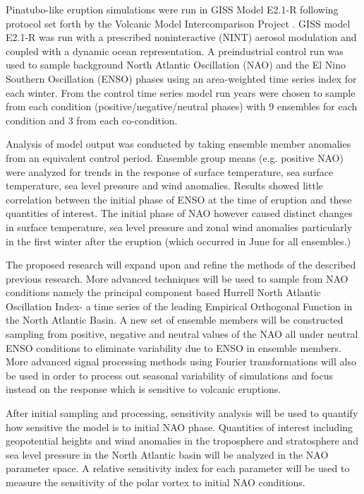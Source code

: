 \documentclass[11pt]{NSFamsart}
\begin{document}
Pinatubo-like eruption simulations were run in GISS Model E2.1-R following protocol set forth by the Volcanic Model Intercomparison Project \cite{zanchettin2016model}. GISS model E2.1-R was run with a prescribed noninteractive (NINT) aerosol modulation and coupled with a dynamic ocean representation. A preindustrial control run was used to sample background North Atlantic Oscillation (NAO) and the El Nino Southern Oscillation (ENSO) phases using an area-weighted time series index for each winter. From the control time series model run years were chosen to sample from each condition (positive/negative/neutral phases) with 9 ensembles for each condition and 3 from each co-condition. 

Analysis of model output was conducted by taking ensemble member anomalies from an equivalent control period. Ensemble group means (e.g. positive NAO) were analyzed for trends in the response of surface temperature, sea surface temperature, sea level pressure and wind anomalies. Results showed little correlation between the initial phase of ENSO at the time of eruption and these quantities of interest. The initial phase of NAO however caused distinct changes in surface temperature, sea level pressure and zonal wind anomalies particularly in the first winter after the eruption (which occurred in June for all ensembles.)

The proposed research will expand upon and refine the methods of the described previous research. More advanced techniques will be used to sample from NAO conditions namely the principal component based Hurrell North Atlantic Oscillation Index- a time series of the leading Empirical Orthogonal Function in the North Atlantic Basin. A new set of ensemble members will be constructed sampling from positive, negative and neutral values of the NAO all under neutral ENSO conditions to eliminate variability due to ENSO in ensemble members. More advanced signal processing methods using Fourier transformations will also be used in order to process out seasonal variability of simulations and focus instead on the response which is sensitive to volcanic eruptions.

After initial sampling and processing, sensitivity analysis will be used to quantify how sensitive the model is to initial NAO phase. Quantities of interest including geopotential heights and wind anomalies in the troposphere and stratosphere and sea level pressure in the North Atlantic basin will be analyzed in the NAO parameter space. A relative sensitivity index for each parameter will be used to measure the sensitivity of the polar vortex to initial NAO conditions.
\end{document}
